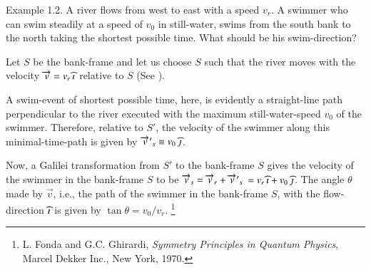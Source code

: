 Example 1.2.  A river flows from west to east with a 
speed  $v_r$. A swimmer who can swim  steadily at a 
speed of $v_0$ in still-water, swims from the south 
bank to the north taking the shortest possible time. 
What should be his swim-direction?
\begin{figure}[ht]
\begin{center}
\caption{} 
\label{fig1.3}
\end{center}
\end{figure}

\soln Let $S$ be the bank-frame and let us choose $S$ 
such that the river moves with the velocity $\overrightarrow{v} = 
v_r\,{\widehat{\imath}}$ relative to $S$ (See ). 
 
A swim-event of shortest possible time, here,  is 
evidently a straight-line path perpendicular to the 
river executed with the maximum still-water-speed $v_0$ 
of the swimmer. Therefore, relative to $S'$, the 
velocity of the swimmer along this minimal-time-path is 
given by ${\overrightarrow{v}\hspace*{.3pt}'}_s\equiv v_0\,{\widehat{\jmath}}$. 

\enlargethispage*{1\bsk}
Now, a Galilei transformation from $S'$ to the 
bank-frame $S$ gives the velocity of the swimmer in the 
bank-frame $S$ to be $\overrightarrow{v}_s=\overrightarrow{v}_r+{\overrightarrow{v}\hspace*{.3pt}'}_s$ 
$=v_r\,{\widehat{\imath}}+v_0\,{\widehat{\jmath}}$. The angle $\theta$ made by 
$\vec{v}$, i.e., the path of the swimmer in the 
bank-frame $S$, with the flow-direction ${\widehat{\imath}}$ is given 
by $\tan\theta = v_0/v_r$. 
\ebx
{}\footnote{L. Fonda and G.C. Ghirardi, 
\textsl{Symmetry Principles in Quantum Physics}, Marcel 
Dekker Inc., New York, 1970.}  
 
